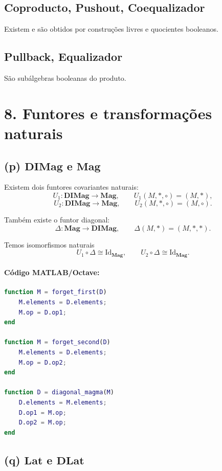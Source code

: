 \documentclass[a4paper,12pt]{article}
\begin{document}
\subsection*{Coproducto, Pushout, Coequalizador}

Existem e são obtidos por construções livres e quocientes booleanos.

\subsection*{Pullback, Equalizador}

São subálgebras booleanas do produto.

\section*{8. Funtores e transformações naturais}

\subsection*{(p) \(\mathbf{DIMag}\) e \(\mathbf{Mag}\)}

Existem dois funtores covariantes naturais:
\[
U_1:\mathbf{DIMag}\to \mathbf{Mag},
\qquad
U_1(M,\ast,\circ)=(M,\ast),
\]
\[
U_2:\mathbf{DIMag}\to \mathbf{Mag},
\qquad
U_2(M,\ast,\circ)=(M,\circ).
\]

Também existe o funtor diagonal:
\[
\Delta:\mathbf{Mag}\to \mathbf{DIMag},
\qquad
\Delta(M,\ast)=(M,\ast,\ast).
\]

Temos isomorfismos naturais
\[
U_1\circ \Delta \cong \mathrm{Id}_{\mathbf{Mag}},
\qquad
U_2\circ \Delta \cong \mathrm{Id}_{\mathbf{Mag}}.
\]

\paragraph{Código MATLAB/Octave:}
\begin{lstlisting}[language=Matlab]
function M = forget_first(D)
    M.elements = D.elements;
    M.op = D.op1;
end

function M = forget_second(D)
    M.elements = D.elements;
    M.op = D.op2;
end

function D = diagonal_magma(M)
    D.elements = M.elements;
    D.op1 = M.op;
    D.op2 = M.op;
end
\end{lstlisting}

\subsection*{(q) \(\mathbf{Lat}\) e \(\mathbf{DLat}\)}
\end{document}
